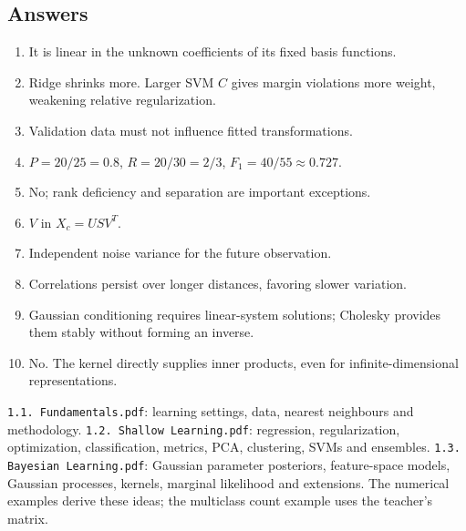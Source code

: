 \documentclass[11pt]{article}
\begin{document}
\subsection{Answers}
\begin{enumerate}
\item It is linear in the unknown coefficients of its fixed basis functions.
\item Ridge shrinks more. Larger SVM $C$ gives margin violations more weight, weakening relative regularization.
\item Validation data must not influence fitted transformations.
\item $P=20/25=0.8$, $R=20/30=2/3$, $F_1=40/55\approx0.727$.
\item No; rank deficiency and separation are important exceptions.
\item $V$ in $X_c=USV^T$.
\item Independent noise variance for the future observation.
\item Correlations persist over longer distances, favoring slower variation.
\item Gaussian conditioning requires linear-system solutions; Cholesky provides them stably without forming an inverse.
\item No. The kernel directly supplies inner products, even for infinite-dimensional representations.
\end{enumerate}
\texttt{1.1. Fundamentals.pdf}: learning settings, data, nearest neighbours and methodology. \texttt{1.2. Shallow Learning.pdf}: regression, regularization, optimization, classification, metrics, PCA, clustering, SVMs and ensembles. \texttt{1.3. Bayesian Learning.pdf}: Gaussian parameter posteriors, feature-space models, Gaussian processes, kernels, marginal likelihood and extensions. The numerical examples derive these ideas; the multiclass count example uses the teacher's matrix.
\end{document}
